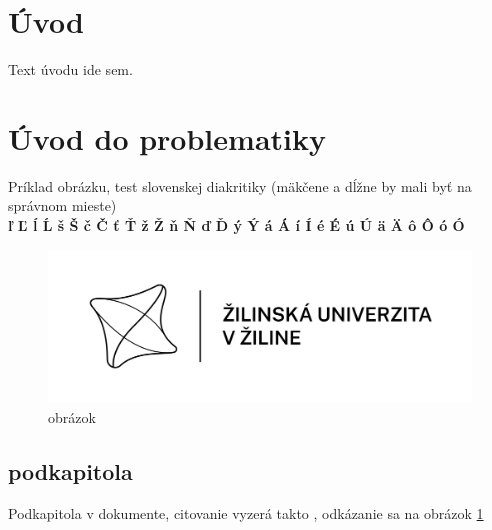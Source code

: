 \documentclass[12pt]{article}
\begin{document}
\listoftodos %
\pagebreak

%


\newpage %
\tableofcontents
\newpage
\listoffigures
\newpage
\listoftables


\newpage
\pagestyle{fancy}
\setcounter{page}{1} %
\section*{Úvod} %
\hspace{1.25cm}Text úvodu ide sem.

\newpage
\section{Úvod do problematiky}
Príklad obrázku, test slovenskej diakritiky (mäkčene a dĺžne by mali byť na správnom mieste) \\
\textbf{ľ Ľ ĺ Ĺ š Š č Č ť Ť ž Ž ň Ň ď Ď ý Ý á Á í Í é É ú Ú ä Ä ô Ô ó Ó}
\begin{figure}[H] %
\centering
\includegraphics{logo}
\caption{obrázok}
\label{img:obrazok}
\end{figure}
\subsection{podkapitola}
Podkapitola v dokumente, citovanie vyzerá takto \cite{modernrob}, odkázanie sa na obrázok \ref{img:obrazok}
\end{document}
